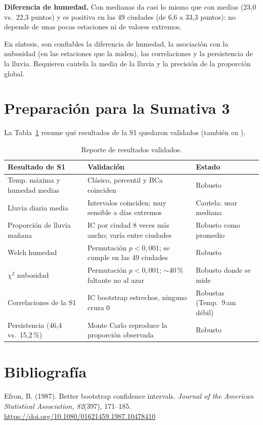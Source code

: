 \documentclass[11pt,a4paper]{article}
\begin{document}
\textbf{Diferencia de humedad.} Con medianas da casi lo mismo que con medias (23,0 vs.\ 22,3 puntos) y es positiva en las 49 ciudades (de 6,6 a 33,3 puntos): no depende de unas pocas estaciones ni de valores extremos.

En síntesis, son confiables la diferencia de humedad, la asociación con la nubosidad (en las estaciones que la miden), las correlaciones y la persistencia de la lluvia. Requieren cautela la media de la lluvia y la precisión de la proporción global.

\section{Preparación para la Sumativa 3}
La Tabla~\ref{tab:val} resume qué resultados de la S1 quedaron validados (también en ).

\begin{table}[H]
\centering\small
\caption{Reporte de resultados validados.}
\label{tab:val}
\begin{tabular}{@{}>{\raggedright\arraybackslash}p{4.2cm}>{\raggedright\arraybackslash}p{6.3cm}>{\raggedright\arraybackslash}p{3.6cm}@{}}
\toprule
Resultado de S1 & Validación & Estado\\
\midrule
Temp. máxima y humedad medias & Clásico, percentil y BCa coinciden & Robusto\\
Lluvia diaria media & Intervalos coinciden; muy sensible a días extremos & Cautela: usar mediana\\
Proporción de lluvia mañana & IC por ciudad 8 veces más ancho; varía entre ciudades & Robusto como promedio\\
Welch humedad & Permutación $p<0{,}001$; se cumple en las 49 ciudades & Robusto\\
$\chi^2$ nubosidad & Permutación $p<0{,}001$; $\sim$40\,\% faltante no al azar & Robusto donde se mide\\
Correlaciones de la S1 & IC bootstrap estrechos, ninguno cruza 0 & Robustas (Temp.\ 9\,am débil)\\
Persistencia (46,4 vs.\ 15,2\,\%) & Monte Carlo reproduce la proporción observada & Robusto\\
\bottomrule
\end{tabular}
\end{table}

\section*{Bibliografía}
\small
\setlength{\parindent}{-1.2em}\setlength{\leftskip}{1.2em}
Efron, B. (1987). Better bootstrap confidence intervals. \textit{Journal of the American Statistical Association, 82}(397), 171--185. \url{https://doi.org/10.1080/01621459.1987.10478410}
\end{document}
